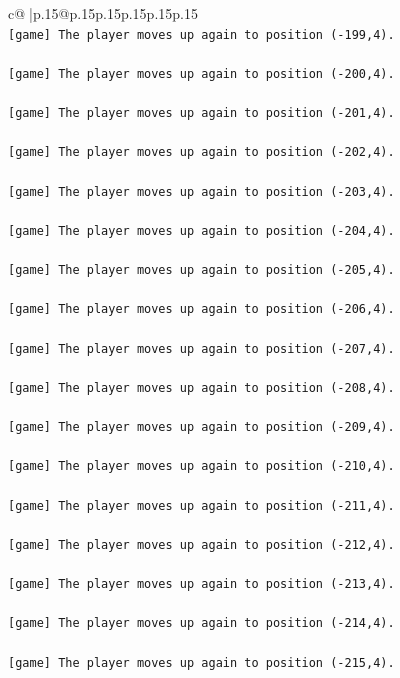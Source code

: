 \documentclass{article}
\begin{document}
{\begin{supertabular}{c@{$\;$}|p{.15\linewidth}@{}p{.15\linewidth}p{.15\linewidth}p{.15\linewidth}p{.15\linewidth}p{.15\linewidth}}
{{{\\ 
\texttt{{[}game{]} The player moves up again to position ({-}199,4).} \\
\\ 
\texttt{{[}game{]} The player moves up again to position ({-}200,4).} \\
\\ 
\texttt{{[}game{]} The player moves up again to position ({-}201,4).} \\
\\ 
\texttt{{[}game{]} The player moves up again to position ({-}202,4).} \\
\\ 
\texttt{{[}game{]} The player moves up again to position ({-}203,4).} \\
\\ 
\texttt{{[}game{]} The player moves up again to position ({-}204,4).} \\
\\ 
\texttt{{[}game{]} The player moves up again to position ({-}205,4).} \\
\\ 
\texttt{{[}game{]} The player moves up again to position ({-}206,4).} \\
\\ 
\texttt{{[}game{]} The player moves up again to position ({-}207,4).} \\
\\ 
\texttt{{[}game{]} The player moves up again to position ({-}208,4).} \\
\\ 
\texttt{{[}game{]} The player moves up again to position ({-}209,4).} \\
\\ 
\texttt{{[}game{]} The player moves up again to position ({-}210,4).} \\
\\ 
\texttt{{[}game{]} The player moves up again to position ({-}211,4).} \\
\\ 
\texttt{{[}game{]} The player moves up again to position ({-}212,4).} \\
\\ 
\texttt{{[}game{]} The player moves up again to position ({-}213,4).} \\
\\ 
\texttt{{[}game{]} The player moves up again to position ({-}214,4).} \\
\\ 
\texttt{{[}game{]} The player moves up again to position ({-}215,4).} \\
}}}
\end{supertabular}}
\end{document}
